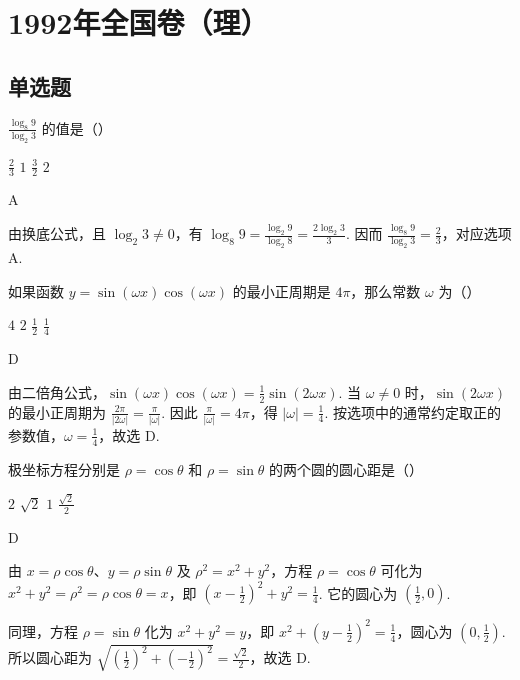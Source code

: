 \chapter{1992年全国卷（理）}
\section{单选题}

\begin{problem}
\(\frac{\log_8 9}{\log_2 3}\) 的值是（\quad）

\choices
    {\(\frac{2}{3}\)}
    {\(1\)}
    {\(\frac{3}{2}\)}
    {\(2\)}

\begin{answer}
A
\end{answer}

\begin{solution}
由换底公式，且 \(\log_2 3\neq0\)，有
\(\log_8 9=\frac{\log_2 9}{\log_2 8}=\frac{2\log_2 3}{3}\). 因而
\(\frac{\log_8 9}{\log_2 3}=\frac{2}{3}\)，对应选项 A.
\end{solution}
\end{problem}

\begin{problem}
如果函数 \(y=\sin(\omega x)\cos(\omega x)\) 的最小正周期是 \(4\pi\)，那么常数 \(\omega\) 为（\quad）

\choices
    {\(4\)}
    {\(2\)}
    {\(\frac{1}{2}\)}
    {\(\frac{1}{4}\)}

\begin{answer}
D
\end{answer}

\begin{solution}
由二倍角公式，\(\sin(\omega x)\cos(\omega x)=\frac{1}{2}\sin(2\omega x)\). 当 \(\omega\neq0\) 时，\(\sin(2\omega x)\) 的最小正周期为 \(\frac{2\pi}{|2\omega|}=\frac{\pi}{|\omega|}\). 因此
\(\frac{\pi}{|\omega|}=4\pi\)，得 \(|\omega|=\frac{1}{4}\). 按选项中的通常约定取正的参数值，\(\omega=\frac{1}{4}\)，故选 D.
\end{solution}
\end{problem}

\begin{problem}
极坐标方程分别是 \(\rho=\cos\theta\) 和 \(\rho=\sin\theta\) 的两个圆的圆心距是（\quad）

\choices
    {\(2\)}
    {\(\sqrt{2}\)}
    {\(1\)}
    {\(\frac{\sqrt{2}}{2}\)}

\begin{answer}
D
\end{answer}

\begin{solution}
由 \(x=\rho\cos\theta\)、\(y=\rho\sin\theta\) 及 \(\rho^2=x^2+y^2\)，方程 \(\rho=\cos\theta\) 可化为
\(x^2+y^2=\rho^2=\rho\cos\theta=x\)，即
\(\left(x-\frac{1}{2}\right)^2+y^2=\frac{1}{4}\). 它的圆心为 \(\left(\frac{1}{2},0\right)\).

同理，方程 \(\rho=\sin\theta\) 化为 \(x^2+y^2=y\)，即
\(x^2+\left(y-\frac{1}{2}\right)^2=\frac{1}{4}\)，圆心为 \(\left(0,\frac{1}{2}\right)\). 所以圆心距为
\(\sqrt{\left(\frac{1}{2}\right)^2+\left(-\frac{1}{2}\right)^2}=\frac{\sqrt{2}}{2}\)，故选 D.
\end{solution}
\end{problem}

